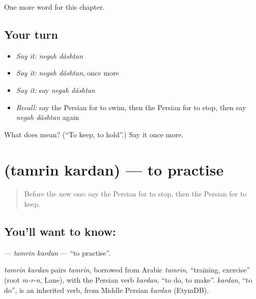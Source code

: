 \begin{grammarlens}[title={What you've built}]
One more word for this chapter.
\end{grammarlens}

\subsection*{Your turn}
\begin{itemize}
\raggedright
  \item \emph{Say it:} \emph{negah dâshtan}
  \item \emph{Say it:} \emph{negah dâshtan}, once more
  \item \emph{Say it:} say \emph{negah dâshtan}
  \item \emph{Recall:} say the Persian for to swim, then the Persian for to stop, then say \emph{negah dâshtan} again
\end{itemize}

\begin{tcolorbox}[breakable,colback=teal!4,colframe=teal!35!black,title={Before you move on}]
What does   mean? (\textquotedblleft{}To keep, to hold\textquotedblright{}.) Say it once more.
\end{tcolorbox}
\section[\texorpdfstring{\fa{تمرین} \fa{کردن} (tamrin kardan)}{تمرین کردن (tamrin kardan)}]{  (tamrin kardan) — to practise}

\label{lesson:FA-C219-tamrin-kardan}



\begin{quote}
Before the new one: say the Persian for to stop, then the Persian for to keep.
\end{quote}

\subsection*{You'll want to know:  }
\textbf{ } — \emph{tamrin kardan} — \textquotedblleft{}to practise\textquotedblright{}.

\begin{cousinweb}
\emph{tamrin kardan} pairs \emph{tamrin}, borrowed from Arabic \emph{tamrīn}, \textquotedblleft{}training, exercise\textquotedblright{} (root \emph{m-r-n}, Lane), with the Persian verb \emph{kardan}, \textquotedblleft{}to do, to make\textquotedblright{}. \emph{kardan}, \textquotedblleft{}to do\textquotedblright{}, is an inherited verb, from Middle Persian \emph{kardan} (EtymDB).
\end{cousinweb}

